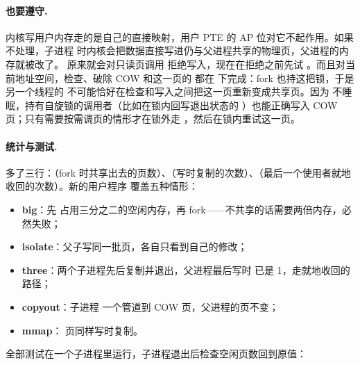 \paragraph{ 也要遵守.} 内核写用户内存走的是自己的直接映射，用户 PTE 的 AP 位对它不起作用。如果不处理，子进程  时内核会把数据直接写进仍与父进程共享的物理页，父进程的内存就被改了。 原来就会对只读页调用  拒绝写入，现在在拒绝之前先试 。而且对当前地址空间，检查、破除 COW 和这一页的  都在  下完成：fork 也持这把锁，于是另一个线程的  不可能恰好在检查和写入之间把这一页重新变成共享页。因为  不睡眠，持有自旋锁的调用者（比如在锁内回写退出状态的 ）也能正确写入 COW 页；只有需要按需调页的情形才在锁外走 ，然后在锁内重试这一页。

\paragraph{统计与测试.}  多了三行：（fork 时共享出去的页数）、（写时复制的次数）、（最后一个使用者就地收回的次数）。新的用户程序  覆盖五种情形：

\begin{itemize}
  \item \textbf{big}：先  占用三分之二的空闲内存，再 fork——不共享的话需要两倍内存，必然失败；
  \item \textbf{isolate}：父子写同一批页，各自只看到自己的修改；
  \item \textbf{three}：两个子进程先后复制并退出，父进程最后写时  已是 1，走就地收回的路径；
  \item \textbf{copyout}：子进程  一个管道到 COW 页，父进程的页不变；
  \item \textbf{mmap}： 页同样写时复制。
\end{itemize}

全部测试在一个子进程里运行，子进程退出后检查空闲页数回到原值：


